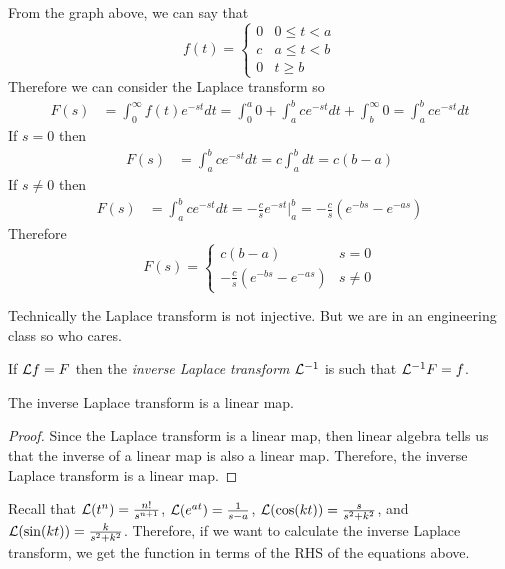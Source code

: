 \documentclass[notes]{subfiles}
\begin{document}
\begin{solution}
    From the graph above, we can say that
    \[
        f(t) = \begin{cases}
            0 & 0 \leq t < a \\
            c & a \leq t < b \\
            0 & t \geq b
        \end{cases}
    \]
    Therefore we can consider the Laplace transform so
    \begin{align*}
        F(s)
        &= \int_0^\infty f(t)e^{-st}dt
        = \int_0^a 0 + \int_a^b ce^{-st}dt + \int_b^\infty 0
        = \int_a^b ce^{-st}dt
    \end{align*}
    If $s = 0$ then
    \begin{align*}
        F(s)
        &= \int_a^b ce^{-st}dt
        = c\int_a^b dt
        = c(b - a)
    \end{align*}
    If $s \neq 0$ then
    \begin{align*}
        F(s)
        &= \int_a^b ce^{-st}dt
        = -\frac{c}{s}e^{-st}\Big|_a^b
        = -\frac{c}{s}(e^{-bs} - e^{-as})
    \end{align*}
    Therefore
    \[
        F(s) = \begin{cases}
            c(b - a) & s = 0 \\
            -\frac{c}{s}(e^{-bs} - e^{-as}) & s \neq 0
        \end{cases}
    \]
\end{solution}

Technically the Laplace transform is not injective. But we are in an engineering class so who cares.
\begin{definition}
    If $\mathcal{L} f = F$ then the \textit{inverse Laplace transform} $\mathcal{L} ^{-1}$ is such that $\mathcal{L} ^{-1}F = f$.
\end{definition}

\begin{lemma}
    The inverse Laplace transform is a linear map.
\end{lemma}
\begin{proof}
    Since the Laplace transform is a linear map, then linear algebra tells us that the inverse of a linear map is also a linear map. Therefore, the inverse Laplace transform is a linear map.
\end{proof}

Recall that $\mathcal{L} (t^n) = \frac{n!}{s^{n + 1}}$, $\mathcal{L} (e^{at}) = \frac{1}{s - a}$, $\mathcal{L} (\cos(kt)) = \frac{s}{s^2 + k^2}$, and $\mathcal{L} (\sin(kt)) = \frac{k}{s^2 + k^2}$. Therefore, if we want to calculate the inverse Laplace transform, we get the function in terms of the RHS of the equations above.
\end{document}

